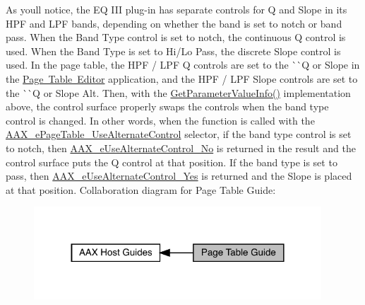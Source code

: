 As you\textquotesingle{}ll notice, the EQ I\+II plug-\/in has separate controls for Q and Slope in its H\+PF and L\+PF bands, depending on whether the band is set to notch or band pass. When the Band Type control is set to notch, the continuous Q control is used. When the Band Type is set to Hi/\+Lo Pass, the discrete Slope control is used. In the page table, the H\+PF / L\+PF Q controls are set to the \`{}\`{}Q or Slope\textquotesingle{}\textquotesingle{} in the \mbox{\hyperlink{a00833_subsection_creating_page_tables_in_pete}{Page Table Editor}} application, and the H\+PF / L\+PF Slope controls are set to the \`{}\`{}Q or Slope Alt\textquotesingle{}\textquotesingle{}. Then, with the \mbox{\hyperlink{a01481_a0d3436cb88b4a86fe82a663221a9cfef}{Get\+Parameter\+Value\+Info()}} implementation above, the control surface properly swaps the controls when the band type control is changed. In other words, when the function is called with the \mbox{\hyperlink{a00491_aa169208a2ce713fa021e20deb2eaf608a1a0d975a333d3aee81b22f878697e9c4}{A\+A\+X\+\_\+e\+Page\+Table\+\_\+\+Use\+Alternate\+Control}} selector, if the band type control is set to notch, then \mbox{\hyperlink{a00491_abbcc8b4e8207262a5dd9e32047a51a29a5cfea068cc7ea51becccc9d26955e443}{A\+A\+X\+\_\+e\+Use\+Alternate\+Control\+\_\+\+No}} is returned in the result and the control surface puts the Q control at that position. If the band type is set to pass, then \mbox{\hyperlink{a00491_abbcc8b4e8207262a5dd9e32047a51a29aa63097dc0b27e51411f30b06b2db26f1}{A\+A\+X\+\_\+e\+Use\+Alternate\+Control\+\_\+\+Yes}} is returned and the Slope is placed at that position.  Collaboration diagram for Page Table Guide\+:
\nopagebreak
\begin{figure}[H]
\begin{center}
\leavevmode
\includegraphics[width=305pt]{a00833}
\end{center}
\end{figure}
